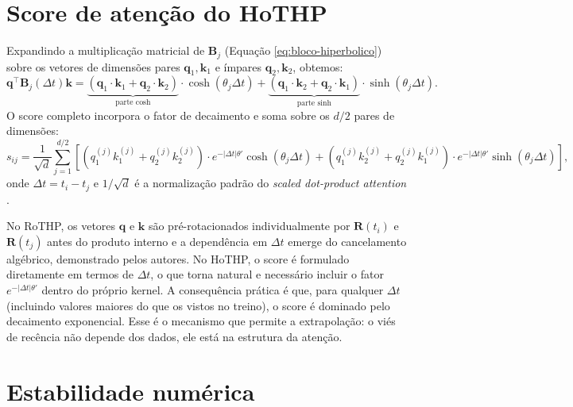 \section{Score de atenção do HoTHP}
\label{sec:score-atencao-hothp}

Expandindo a multiplicação matricial de $\mathbf{B}_j$ (Equação \ref{eq:bloco-hiperbolico}) sobre os vetores de dimensões pares $\mathbf{q}_1, \mathbf{k}_1$ e ímpares $\mathbf{q}_2, \mathbf{k}_2$, obtemos:
%
\begin{equation}
    \mathbf{q}^\top \mathbf{B}_j(\Delta t) \mathbf{k}
    = \underbrace{(\mathbf{q}_1 \cdot \mathbf{k}_1 + \mathbf{q}_2 \cdot \mathbf{k}_2)}_{\text{parte cosh}} \cdot \cosh(\theta_j \Delta t)
    + \underbrace{(\mathbf{q}_1 \cdot \mathbf{k}_2 + \mathbf{q}_2 \cdot \mathbf{k}_1)}_{\text{parte sinh}} \cdot \sinh(\theta_j \Delta t).
    \label{eq:score-par-dimensoes}
\end{equation}
%
O score completo incorpora o fator de decaimento e soma sobre os $d/2$ pares de dimensões:
%
\begin{equation}
    s_{ij} = \frac{1}{\sqrt{d}} \sum_{j=1}^{d/2}
    \left[
        (q_{1}^{(j)} k_{1}^{(j)} + q_{2}^{(j)} k_{2}^{(j)}) \cdot e^{-|\Delta t|\theta'} \cosh(\theta_j \Delta t)
        + (q_{1}^{(j)} k_{2}^{(j)} + q_{2}^{(j)} k_{1}^{(j)}) \cdot e^{-|\Delta t|\theta'} \sinh(\theta_j \Delta t)
    \right],
    \label{eq:score-hothp-completo}
\end{equation}
%
onde $\Delta t = t_i - t_j$ e $1/\sqrt{d}$ é a normalização padrão do \textit{scaled dot-product attention} \cite{vaswani_attention_2017}.

No RoTHP, os vetores $\mathbf{q}$ e $\mathbf{k}$ são pré-rotacionados individualmente por $\mathbf{R}(t_i)$ e $\mathbf{R}(t_j)$ antes do produto interno e a dependência em $\Delta t$ emerge do cancelamento algébrico, demonstrado pelos autores. No HoTHP, o score é formulado diretamente em termos de $\Delta t$, o que torna natural e necessário incluir o fator $e^{-|\Delta t|\theta'}$ dentro do próprio kernel. A consequência prática é que, para qualquer $\Delta t$ (incluindo valores maiores do que os vistos no treino), o score é dominado pelo decaimento exponencial. Esse é o mecanismo que permite a extrapolação: o viés de recência não depende dos dados, ele está na estrutura da atenção.

\section{Estabilidade numérica}
\label{sec:estabilidade-numerica}

